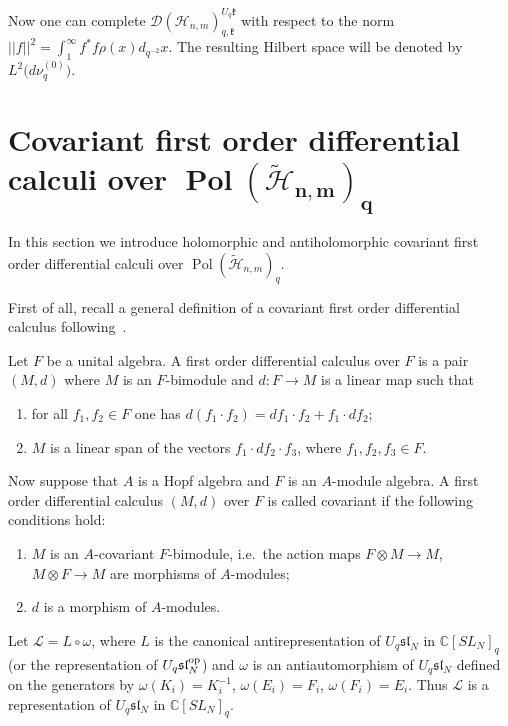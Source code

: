 Now one can complete $\mathscr{D}(\mathscr{H}_{n,m})_{q,\mathfrak{k}}^{U_q \mathfrak{k}}$ with respect to the
norm $||f||^2=\int_1^\infty f^*f \rho(x)d_{q^{-2}}x$. The resulting Hilbert space will be denoted by
$L^2\big(d\nu_q^{(0)}\big)$.



\section[Covariant first order differential calculi over $\operatorname{Pol}(\widetilde{\mathscr{H}}_{n,m})_q$]{Covariant f\/irst order dif\/ferential calculi over $\boldsymbol{\operatorname{Pol}(\widetilde{\mathscr{H}}_{n,m})_q}$}
\label{sec_5}

In this section we introduce   holomorphic and antiholomorphic covariant f\/irst order dif\/ferential calculi
over $\operatorname{Pol}(\widetilde{\mathscr{H}}_{n,m})_q$.

First of all, recall a general def\/inition of a covariant f\/irst order dif\/ferential calculus fol\-lowing~\cite{Kl-Sch}.

Let $F$ be a unital algebra. A f\/irst order dif\/ferential calculus over $F$ is a pair $(M,d)$ where $M$ is an
$F$-bimodule and $d:F \rightarrow M$ is a linear map such that
\begin{enumerate}\itemsep=0pt
\item for all $f_1,f_2 \in F$ one has $d(f_1 \cdot f_2)=df_1 \cdot f_2+f_1 \cdot df_2$;
\item $M$ is a linear span of the vectors $f_1 \cdot df_2 \cdot f_3$, where $f_1,f_2,f_3 \in F$.
\end{enumerate}

Now suppose that $A$ is a Hopf algebra and $F$ is an $A$-module algebra. A f\/irst order dif\/ferential calculus
$(M,d)$ over $F$ is called covariant if the following conditions hold:
\begin{enumerate}\itemsep=0pt
\item $M$ is an $A$-covariant $F$-bimodule, i.e.\ the action maps $F \otimes M \rightarrow M$, $M \otimes F \rightarrow M$
are morphisms of $A$-modules;
\item $d$ is a morphism of $A$-modules.
\end{enumerate}

Let $\mathcal{L}=L \circ \omega$, where $L$ is the canonical antirepresentation of $U_q \mathfrak{sl}_N$ in
$\mathbb C[SL_N]_q$ (or the representation of $U_q \mathfrak{sl}_N^{\rm op}$) and $\omega$ is an
antiautomorphism of $U_q \mathfrak{sl}_N$ def\/ined on the generators by $\omega(K_i)=K_i^{-1}$,
$\omega(E_i)=F_i$, $\omega(F_i)=E_i$. Thus $\mathcal{L}$ is a representation of $U_q \mathfrak{sl}_N$ in
$\mathbb C[SL_N]_q$.

